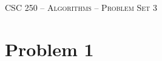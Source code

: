 \documentclass[11pt]{article}
\theoremstyle{nonumberplain}
\begin{document}



\begin{center}

{\LARGE
\textsc{CSC 250 -- Algorithms -- Problem Set 3}
\bigskip}

\end{center}

\section*{Problem 1}

\end{document}

